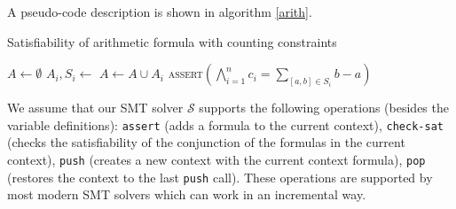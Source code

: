 A pseudo-code description is shown in algorithm \ref{arith}.

\begin{algorithm}[h]
\caption{Satisfiability of arithmetic formula with counting constraints}\label{arith}
\begin{algorithmic}[1]
\State {}
    \State {}
    \State $A \gets \emptyset$
        \State $A_i, S_i \gets $ 
        \State $A \gets A \cup A_i$
            \State {}
            \State {}
        \EndIf
    \EndFor
    \State {}
    \State \textsc{assert}$\left(\bigwedge\limits_{i=1}^n c_i = \sum\limits_{[a, b] \in S_i} b - a\right)$
        \State {}
        \State {}
    \EndIf
    \State {}
    \State {}
\EndWhile
\State {}
\end{algorithmic}
\label{arith}
\end{algorithm}

We assume that our SMT solver $\mathcal{S}$ supports the following operations (besides the variable definitions):
\texttt{assert} (adds a formula to the current context),
\texttt{check-sat} (checks the satisfiability of the conjunction of the
formulas in the current context), \texttt{push} (creates a new context
with the current context formula), \texttt{pop} (restores the context to
the last \texttt{push} call). These operations are supported by most
modern SMT solvers which can work in an incremental way.


